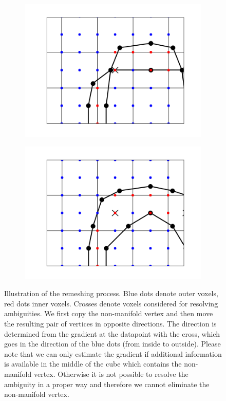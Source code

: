 \begin{figure}[t]
\begin{center}
\begin{subfigure}{.5\linewidth}
\centering
\includegraphics[width = \textwidth]{Pictures/SurfaceReconstruction/2DDoubleTorusNonManifoldDetail}
\end{subfigure}%
\begin{subfigure}{.5\linewidth}
\centering
\includegraphics[width = \textwidth]{Pictures/SurfaceReconstruction/2DDoubleTorusManifoldDetail}
\end{subfigure}
\end{center}
\caption{Illustration of the remeshing process. Blue dots denote outer voxels, red dots inner voxels. Crosses denote voxels considered for resolving ambiguities. We first copy the non-manifold vertex and then move the resulting pair of vertices in opposite directions. The direction is determined from the gradient at the datapoint with the cross, which goes in the direction of the blue dots (from inside to outside). Please note that we can only estimate the gradient if additional information is available in the middle of the cube which contains the non-manifold vertex. Otherwise it is not possible to resolve the ambiguity in a proper way and therefore we cannot eliminate the non-manifold vertex.}
\label{fig:manifoldResolution2D}
\end{figure}

